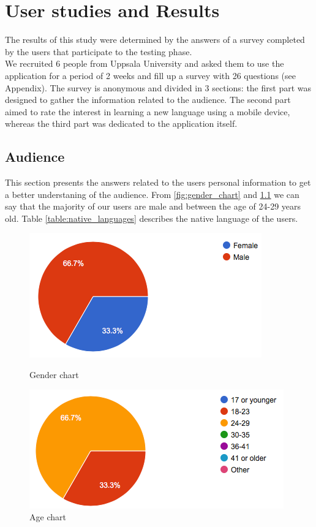 \chapter{User studies and Results}
\label{chap:results}

The results of this study were determined by the answers of a survey completed by the users that participate to the testing phase. \\
\noindent We recruited 6 people from Uppsala University and asked them to use the application for a period of 2 weeks and fill up a survey with 26 questions (see Appendix). The survey is anonymous and divided in 3 sections: the first part was designed to gather the information related to the audience. The second part aimed to rate the interest in learning a new language using a mobile device, whereas the third part was dedicated to the application itself. \\

\section{Audience}
\label{sub:Audience}

This section presents the answers related to the users personal information to get a better understaning of the audience. From \ref{fig:gender_chart} and \ref{fig:age_chart} we can say that the majority of our users are male and between the age of 24-29 years old.  Table \ref{table:native_languages} describes the native language of the users.

\begin{figure}[!ht]
	\centering
	\begin{minipage}{.5\textwidth}
		\centering
		\includegraphics[scale=0.5]{Figures/responses/audience_gender.png}
		\caption{Gender chart}
		\label{fig:gender_chart}
	\end{minipage}%
	\begin{minipage}{.5\textwidth}
		\centering
		\includegraphics[scale=0.5]{Figures/responses/audience_age.png}
		\caption{Age chart}
		\label{fig:age_chart}
	\end{minipage}
\end{figure}

